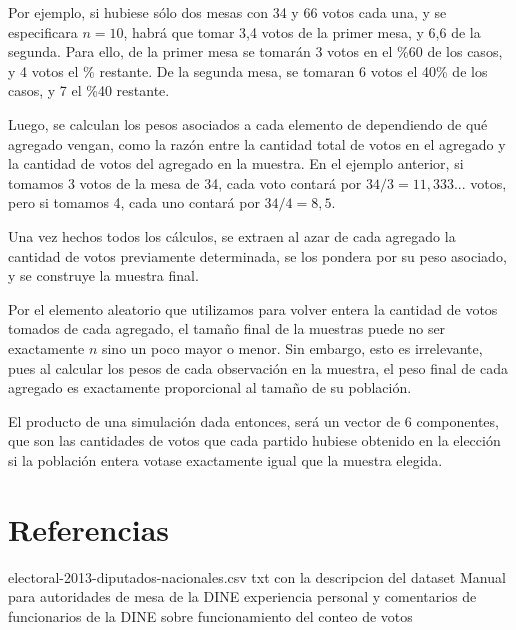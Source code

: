 \documentclass[12pt, a4paper]{article}
\begin{document}
Por ejemplo, si hubiese s\'olo dos mesas con 34 y 66 votos cada una, y se especificara $n=10$, habr\'a que tomar 3,4 votos de la primer mesa, y 6,6 de la segunda. Para ello, de la primer mesa se tomar\'an 3 votos en el \%60 de los casos, y 4 votos el \% restante. De la segunda mesa, se tomaran 6 votos el 40\% de los casos, y 7 el \%40 restante.


Luego, se calculan los pesos asociados a cada elemento de dependiendo de qu\'e agregado vengan, como la raz\'on entre la cantidad total de votos en el agregado y la cantidad de votos del agregado en la muestra. En el ejemplo anterior, si tomamos 3 votos de la mesa de 34, cada voto contar\'a por $34/3 = 11,333...$ votos, pero si tomamos 4, cada uno contar\'a por $34/4 = 8,5$.

Una vez hechos todos los c\'alculos, se extraen al azar de cada agregado la cantidad de votos previamente determinada, se los pondera por su peso asociado, y se construye la muestra final.

Por el elemento aleatorio que utilizamos para volver entera la cantidad de votos tomados de cada agregado, el tama\~no final de la muestras puede no ser exactamente $n$ sino un poco mayor o menor. Sin embargo, esto es irrelevante, pues al calcular los pesos de cada observaci\'on en la muestra, el peso final de cada agregado es exactamente proporcional al tama\~no de su poblaci\'on.

El producto de una simulaci\'on dada entonces, ser\'a un vector de 6 componentes, que son las cantidades de votos que cada partido hubiese obtenido en la elecci\'on si la poblaci\'on entera votase exactamente igual que la muestra elegida.





\section{Referencias}
electoral-2013-diputados-nacionales.csv
txt con la descripcion del dataset
Manual para autoridades de mesa de la DINE
experiencia personal y comentarios de funcionarios de la DINE sobre funcionamiento del conteo de votos
\end{document}
